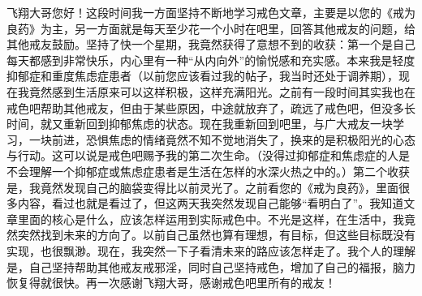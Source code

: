 \begin{case}
    飞翔大哥您好！这段时间我一方面坚持不断地学习戒色文章，主要是以您的《戒为良药》为主，另一方面就是每天至少花一个小时在吧里，回答其他戒友的问题，给其他戒友鼓励。坚持了快一个星期，我竟然获得了意想不到的收获：第一个是自己每天都感到非常快乐，内心里有一种“从内向外”的愉悦感和充实感。本来我是轻度抑郁症和重度焦虑症患者（以前您应该看过我的帖子，我当时还处于调养期），现在我竟然感到生活原来可以这样积极，这样充满阳光。之前有一段时间其实我也在戒色吧帮助其他戒友，但由于某些原因，中途就放弃了，疏远了戒色吧，但没多长时间，就又重新回到抑郁焦虑的状态。现在我重新回到吧里，与广大戒友一块学习，一块前进，恐惧焦虑的情绪竟然不知不觉地消失了，换来的是积极阳光的心态与行动。这可以说是戒色吧赐予我的第二次生命。（没得过抑郁症和焦虑症的人是不会理解一个抑郁症或焦虑症患者是生活在怎样的水深火热之中的。）第二个收获是，我竟然发现自己的脑袋变得比以前灵光了。之前看您的《戒为良药》，里面很多内容，看过也就是看过了，但这两天我突然发现自己能够“看明白了”。我知道文章里面的核心是什么，应该怎样运用到实际戒色中。不光是这样，在生活中，我竟然突然找到未来的方向了。以前自己虽然也算有理想，有目标，但这些目标既没有实现，也很飘渺。现在，我突然一下子看清未来的路应该怎样走了。我个人的理解是，自己坚持帮助其他戒友戒邪淫，同时自己坚持戒色，增加了自己的福报，脑力恢复得就很快。再一次感谢飞翔大哥，感谢戒色吧里所有的戒友！


\end{case}
